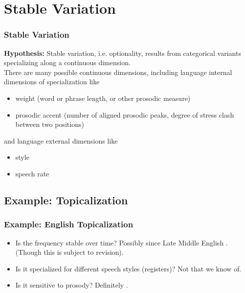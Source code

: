 \documentclass[hyperref={pdfpagelabels=false}]{beamer}
\begin{document}
\section{Stable Variation}
\begin{frame}
\frametitle{Stable Variation}
\textbf{Hypothesis:} Stable variation, i.e. optionality, results from categorical variants specializing along a continuous dimension.\\
\vspace{4mm}
There are many possible continuous dimensions, including language internal dimensions of specialization like
	\begin{itemize}
		\item weight (word or phrase length, or other prosodic measure)
		\item prosodic accent (number of aligned prosodic peaks, degree of stress clash between two positions)
	\end{itemize}
and language external dimensions like
	\begin{itemize}
		\item style
		\item speech rate
	\end{itemize}
\end{frame}

\subsection{Example: Topicalization}
\begin{frame}
\frametitle{Example: English Topicalization}

\begin{itemize}
	\item Is the frequency stable over time? Possibly since Late Middle English \citep{speyer2010}. (Though this is subject to revision).
	\item Is it specialized for different speech styles (registers)? Not that we know of.
	\item Is it sensitive to prosody? Definitely \citep{speyer2008, speyer2010}.
\end{itemize}
\end{frame}
\end{document}
